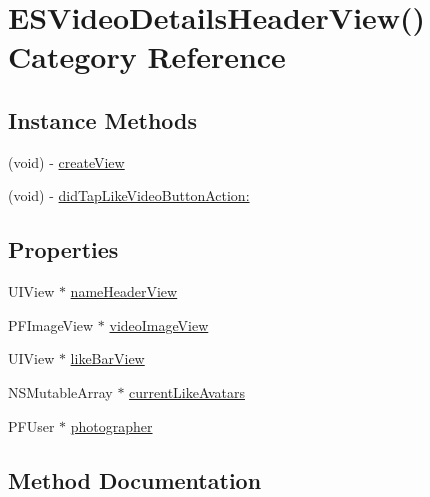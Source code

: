 \hypertarget{category_e_s_video_details_header_view_07_08}{}\section{E\+S\+Video\+Details\+Header\+View() Category Reference}
\label{category_e_s_video_details_header_view_07_08}
\subsection*{Instance Methods}
\begin{DoxyCompactItemize}
\item 
(void) -\/ \hyperlink{category_e_s_video_details_header_view_07_08_a6bfb7e436b5b5e19aa8a999f1342286a}{create\+View}
\item 
(void) -\/ \hyperlink{category_e_s_video_details_header_view_07_08_a0729ea9e20ade100953ddf6eecbcdad5}{did\+Tap\+Like\+Video\+Button\+Action\+:}
\end{DoxyCompactItemize}
\subsection*{Properties}
\begin{DoxyCompactItemize}
\item 
U\+I\+View $\ast$ \hyperlink{category_e_s_video_details_header_view_07_08_a2a1ed754b0a99d09e79a390fe50226e2}{name\+Header\+View}
\item 
P\+F\+Image\+View $\ast$ \hyperlink{category_e_s_video_details_header_view_07_08_a4486f657dd26c68c6dd89e2a3bea9a34}{video\+Image\+View}
\item 
U\+I\+View $\ast$ \hyperlink{category_e_s_video_details_header_view_07_08_af42ed1bacbcf9235870450b6af3ccc72}{like\+Bar\+View}
\item 
N\+S\+Mutable\+Array $\ast$ \hyperlink{category_e_s_video_details_header_view_07_08_a0ac0cad5269e612f08dfd29c46cf9295}{current\+Like\+Avatars}
\item 
P\+F\+User $\ast$ \hyperlink{category_e_s_video_details_header_view_07_08_a0701698bf7def5f0d5d89bdebe7e4856}{photographer}
\end{DoxyCompactItemize}


\subsection{Method Documentation}
\hypertarget{category_e_s_video_details_header_view_07_08_a6bfb7e436b5b5e19aa8a999f1342286a}{}
